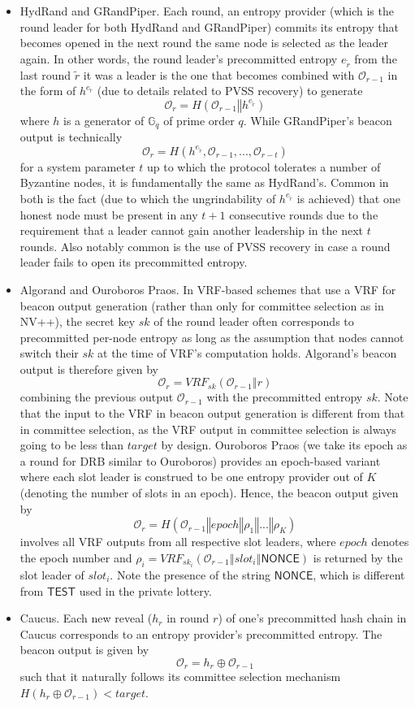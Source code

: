 \documentclass[letterpaper,twocolumn,10pt]{article}
\theoremstyle{definition}
\theoremstyle{remark}
\begin{document}
\begin{itemize}
\item HydRand and GRandPiper. Each round, an entropy provider (which is the round leader for both HydRand and GRandPiper) commits its entropy that becomes opened in the next round the same node is selected as the leader again. In other words, the round leader's precommitted entropy $e_{\tilde{r}}$ from the last round $\tilde{r}$ it was a leader is the one that becomes combined with $\mathcal{O}_{r - 1}$ in the form of $h^{e_{\tilde{r}}}$ (due to details related to PVSS recovery) to generate
\[
\mathcal{O}_r = H(\mathcal{O}_{r - 1} \mathbin\Vert h^{e_{\tilde{r}}})
\]
where $h$ is a generator of $\mathbb{G}_q$ of prime order $q$. While GRandPiper's beacon output is technically
\[
\mathcal{O}_r = H(h^{e_{\tilde{r}}}, \mathcal{O}_{r - 1}, ..., \mathcal{O}_{r - t})
\]
for a system parameter $t$ up to which the protocol tolerates a number of Byzantine nodes, it is fundamentally the same as HydRand's. Common in both is the fact (due to which the ungrindability of $h^{e_{\tilde{r}}}$ is achieved) that one honest node must be present in any $t + 1$ consecutive rounds due to the requirement that a leader cannot gain another leadership in the next $t$ rounds. Also notably common is the use of PVSS recovery in case a round leader fails to open its precommitted entropy.
\item Algorand and Ouroboros Praos. In VRF-based schemes that use a VRF for beacon output generation (rather than only for committee selection as in NV++), the secret key $sk$ of the round leader often corresponds to precommitted per-node entropy as long as the assumption that nodes cannot switch their $sk$ at the time of VRF's computation holds. Algorand's beacon output is therefore given by
\[
\mathcal{O}_r = VRF_{sk}(\mathcal{O}_{r - 1} \mathbin\Vert r)
\]
combining the previous output $\mathcal{O}_{r - 1}$ with the precommitted entropy $sk$. Note that the input to the VRF in beacon output generation is different from that in committee selection, as the VRF output in committee selection is always going to be less than $target$ by design. Ouroboros Praos (we take its epoch as a round for DRB similar to Ouroboros) provides an epoch-based variant where each slot leader is construed to be one entropy provider out of $K$ (denoting the number of slots in an epoch). Hence, the beacon output given by
\[
\mathcal{O}_r = H(\mathcal{O}_{r - 1} \mathbin\Vert epoch \mathbin\Vert \rho_1 \mathbin\Vert ... \mathbin\Vert \rho_K)
\]
involves all VRF outputs from all respective slot leaders, where $epoch$ denotes the epoch number and $\rho_i = VRF_{sk_i}(\mathcal{O}_{r - 1} \mathbin\Vert slot_i \mathbin\Vert \mathsf{NONCE})$ is returned by the slot leader of $slot_i$. Note the presence of the string $\mathsf{NONCE}$, which is different from $\mathsf{TEST}$ used in the private lottery.
\item Caucus. Each new reveal ($h_r$ in round $r$) of one's precommitted hash chain in Caucus corresponds to an entropy provider's precommitted entropy. The beacon output is given by
\[
\mathcal{O}_r = h_r \oplus \mathcal{O}_{r - 1}
\]
such that it naturally follows its committee selection mechanism $H(h_r \oplus \mathcal{O}_{r - 1}) < target$.
\end{itemize}
\end{document}
